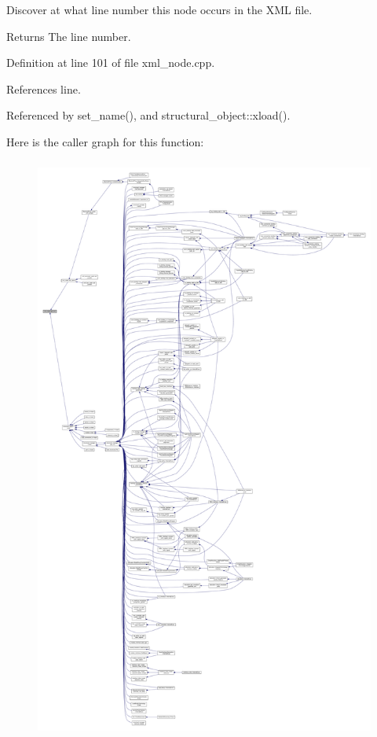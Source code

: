 Discover at what line number this node occurs in the X\+ML file. 

\begin{DoxyReturn}{Returns}
The line number. 
\end{DoxyReturn}


Definition at line 101 of file xml\+\_\+node.\+cpp.



References line.



Referenced by set\+\_\+name(), and structural\+\_\+object\+::xload().

Here is the caller graph for this function\+:
\nopagebreak
\begin{figure}[H]
\begin{center}
\leavevmode
\includegraphics[height=550pt]{d1/dc3/classxml__node_afc1ae2a83ce4949d511fdaef96d0e4f7_icgraph}
\end{center}
\end{figure}
\mbox{\label{classxml__node_a3ed9ef0b9fa4767ef02a1be8e01217b3}} 

